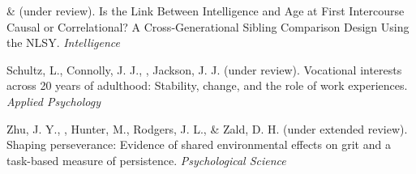 \begin{etaremune}
\item\meb \& \Joe (under review). Is the Link Between Intelligence and Age at First Intercourse Causal or Correlational? A Cross-Generational Sibling Comparison Design Using the NLSY. \textit{Intelligence}
\item Schultz, L., Connolly, J. J., \meb, Jackson, J. J. (under review). Vocational interests across 20 years of adulthood: Stability, change, and the role of work experiences. \textit{Applied Psychology}
\item Zhu, J. Y., \meb, Hunter, M., Rodgers, J. L., \& Zald, D. H. (under extended review). Shaping perseverance: Evidence of shared environmental effects on grit and a task-based measure of persistence. \textit{Psychological Science}
\end{etaremune}
